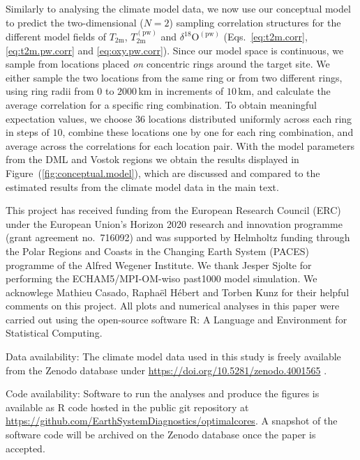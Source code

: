 \documentclass[draft]{agujournal2019}
\begin{document}
Similarly to analysing the climate model data, we now use our conceptual model
to predict the two-dimensional ($N=2$) sampling correlation structures for the
different model fields of $T_{\mathrm{2m}}$, $T_{\mathrm{2m}}^{\mathrm{(pw)}}$
and $\delta^{18}\mathrm{O}^{\mathrm{(pw)}}$ (Eqs.~\ref{eq:t2m.corr},
\ref{eq:t2m.pw.corr} and \ref{eq:oxy.pw.corr}). Since our model space is
continuous, we sample from locations placed \emph{on} concentric rings around
the target site. We either sample the two locations from the same ring or from
two different rings, using ring radii from $0$ to $2000$\,km in increments of
$10$\,km, and calculate the average correlation for a specific ring
combination. To obtain meaningful expectation values, we choose $36$ locations
distributed uniformly across each ring in steps of $10$\textdegree, combine
these locations one by one for each ring combination, and average across the
correlations for each location pair. With the model parameters from the DML and
Vostok regions we obtain the results displayed in
Figure~(\ref{fig:conceptual.model}), which are discussed and compared to the
estimated results from the climate model data in the main text.

\acknowledgments
This project has received funding from the European Research Council (ERC) under
the European Union's Horizon 2020 research and innovation programme  (grant
agreement no.\ 716092) and was supported by Helmholtz funding through the Polar
Regions and Coasts in the Changing Earth System (PACES) programme of the Alfred
Wegener Institute. We thank Jesper Sjolte for performing the ECHAM5/MPI-OM-wiso
past1000 model simulation. We acknowlege Mathieu Casado, Rapha\"{e}l H\'{e}bert
and Torben Kunz for their helpful comments on this project. All plots and
numerical analyses in this paper were carried out using the open-source software
R: A Language and Environment for Statistical Computing.

Data availability: The climate model data used in this study is freely available
from the Zenodo database under \url{https://doi.org/10.5281/zenodo.4001565}
\cite{Munch2020}.

Code availability: Software to run the analyses and produce the figures is
available as R code hosted in the public git repository at
\url{https://github.com/EarthSystemDiagnostics/optimalcores}. A snapshot of the
software code will be archived on the Zenodo database once the paper is
accepted.


\end{document}
